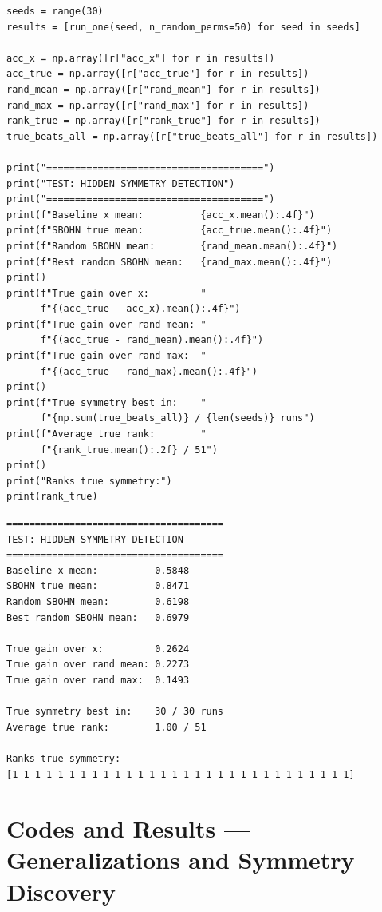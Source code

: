 \documentclass[11pt,a4paper]{report}
\begin{document}
\begin{lstlisting}[caption=SBOHN Experiment 9: hidden symmetry detection]
seeds = range(30)
results = [run_one(seed, n_random_perms=50) for seed in seeds]

acc_x = np.array([r["acc_x"] for r in results])
acc_true = np.array([r["acc_true"] for r in results])
rand_mean = np.array([r["rand_mean"] for r in results])
rand_max = np.array([r["rand_max"] for r in results])
rank_true = np.array([r["rank_true"] for r in results])
true_beats_all = np.array([r["true_beats_all"] for r in results])

print("======================================")
print("TEST: HIDDEN SYMMETRY DETECTION")
print("======================================")
print(f"Baseline x mean:          {acc_x.mean():.4f}")
print(f"SBOHN true mean:          {acc_true.mean():.4f}")
print(f"Random SBOHN mean:        {rand_mean.mean():.4f}")
print(f"Best random SBOHN mean:   {rand_max.mean():.4f}")
print()
print(f"True gain over x:         "
      f"{(acc_true - acc_x).mean():.4f}")
print(f"True gain over rand mean: "
      f"{(acc_true - rand_mean).mean():.4f}")
print(f"True gain over rand max:  "
      f"{(acc_true - rand_max).mean():.4f}")
print()
print(f"True symmetry best in:    "
      f"{np.sum(true_beats_all)} / {len(seeds)} runs")
print(f"Average true rank:        "
      f"{rank_true.mean():.2f} / 51")
print()
print("Ranks true symmetry:")
print(rank_true)
\end{lstlisting}

\label{app:ch3-lst20}
\begin{lstlisting}[style=textstyle, caption=Result of SBOHN-9 experiment]
======================================
TEST: HIDDEN SYMMETRY DETECTION
======================================
Baseline x mean:          0.5848
SBOHN true mean:          0.8471
Random SBOHN mean:        0.6198
Best random SBOHN mean:   0.6979

True gain over x:         0.2624
True gain over rand mean: 0.2273
True gain over rand max:  0.1493

True symmetry best in:    30 / 30 runs
Average true rank:        1.00 / 51

Ranks true symmetry:
[1 1 1 1 1 1 1 1 1 1 1 1 1 1 1 1 1 1 1 1 1 1 1 1 1 1 1 1 1 1]
\end{lstlisting}

\section{Codes and Results --- Generalizations and Symmetry Discovery}
\end{document}

